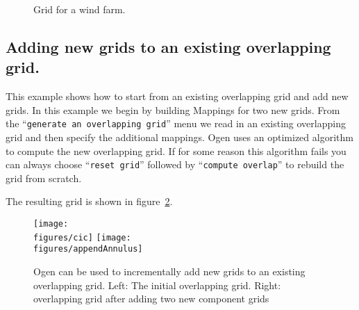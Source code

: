 \documentclass[xcolor=rgb,svgnames,dvipsnames]{article}
\newcommand{\figures}{../fig}
\newcommand{\ogen}{\OvertureDir/ogen}
\begin{document}
{
\newcommand{\figWidthd}{12cm}
\newcommand{\trimfig}[2]{\trimPlot{#1}{#2}{.0}{.0}{.15}{.3}}
\begin{figure}[hbt]
\begin{center}
\end{center}
\caption{Grid for a wind farm.} \label{fig:ogen}
\end{figure}
}

\clearpage
\subsection{Adding new grids to an existing overlapping grid.}
  This example shows how to start from an existing overlapping grid and add
new grids. In this example we begin by building Mappings for two new grids.
From the ``{\tt generate an overlapping grid}'' menu we read in an existing
overlapping grid and then specify the additional mappings. Ogen uses an optimized algorithm
to compute the new overlapping grid. If for some reason this algorithm fails you can always
choose ``{\tt reset grid}'' followed by ``{\tt compute overlap}'' to rebuild the grid
from scratch.
\begin{multicols}{2}
{\footnotesize
\listinginput[1]{1}{\ogen /appendAnnulus.cmd}
}
\end{multicols}
The resulting grid is shown in figure~\ref{fig:appendAnnulus}.
\begin{figure}[htb]
  \begin{center}
   \texttt{[image: \\figures/cic]}
   \texttt{[image: \\figures/appendAnnulus]}
  \caption{Ogen can be used to incrementally add new grids to an existing overlapping grid. 
       Left: The initial overlapping grid. Right: overlapping grid after adding two new component grids} \label{fig:appendAnnulus}
  \end{center}
\end{figure}
\end{document}
